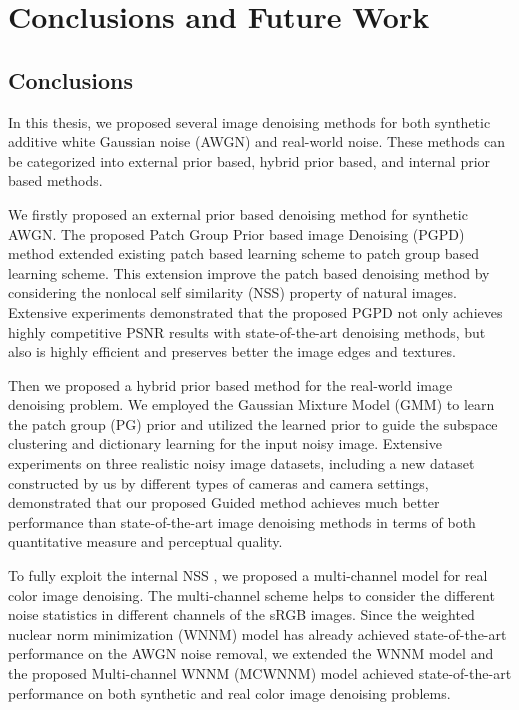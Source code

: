 %
\chapter{Conclusions and Future Work}
\label{sec:conclusions}


\section{Conclusions}
\label{sec:conclusions:sec1}
In this thesis, we proposed several image denoising methods for both synthetic additive white Gaussian noise (AWGN) and real-world noise. These methods can be categorized into external prior based, hybrid prior based, and internal prior based methods.

We firstly proposed an external prior based denoising method for synthetic AWGN. The proposed Patch Group Prior based image Denoising (PGPD) method extended existing patch based learning scheme \cite{epll} to patch group based learning scheme. This extension improve the patch based denoising method by considering the nonlocal self similarity (NSS) property of natural images. Extensive experiments demonstrated that the proposed PGPD not only achieves highly competitive PSNR results with state-of-the-art denoising methods, but also is highly efficient and preserves better the image edges and textures.

Then we proposed a hybrid prior based method for the real-world image denoising problem. We employed the Gaussian Mixture Model (GMM) to learn the patch group (PG) prior and utilized the learned prior to guide the subspace clustering and dictionary learning for the input noisy image. Extensive experiments on three realistic noisy image datasets, including a new dataset constructed by us by different types of cameras and camera settings, demonstrated that our proposed Guided method achieves much better performance than state-of-the-art image denoising methods in terms of both quantitative measure and perceptual quality.

To fully exploit the internal NSS , we proposed a multi-channel model for real color image denoising. The multi-channel scheme helps to consider the different noise statistics in different channels of the sRGB images. Since the weighted nuclear norm minimization (WNNM) model has already achieved state-of-the-art performance on the AWGN noise removal, we extended the WNNM model and the proposed Multi-channel WNNM (MCWNNM) model achieved state-of-the-art performance on both synthetic and real color image denoising problems. 

